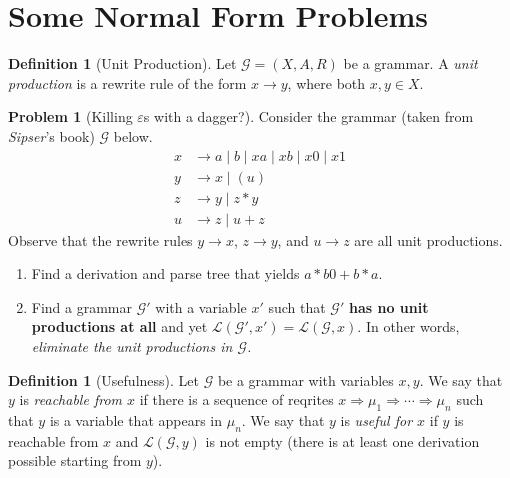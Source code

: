 \documentclass[11pt]{article}
\theoremstyle{definition} %
\newtheorem{definition}     [theorem]   {{\color{NavyBlue}Definition}}
\newtheorem{problem}                    {{\color{BurntOrange}Problem}}
\theoremstyle{remark} %
\begin{document}
\pagebreak 

\section{Some Normal Form Problems}

\begin{definition}[Unit Production]
    Let \(\mathcal G = (X, A, R)\) be a grammar.
    A \emph{unit production} is a rewrite rule of the form \(x \to y\), where both \(x,y \in X\).
\end{definition}

\begin{problem}[Killing \(\varepsilon\)s with a dagger?]
    Consider the grammar (taken from \emph{Sipser}'s book) \(\mathcal G\) below.
    \[\begin{aligned}
        x &\to a \mid b \mid xa \mid xb \mid x0 \mid x1 \\
        y &\to x \mid (u) \\
        z &\to y \mid z * y \\
        u &\to z \mid u + z 
    \end{aligned}\]
    Observe that the rewrite rules \(y \to x\), \(z \to y\), and \(u \to z\) are all unit productions.
    \begin{enumerate}
        \item Find a derivation and parse tree that yields \(a*b0+b*a\).
        \item Find a grammar \(\mathcal G'\) with a variable \(x'\) such that \(\mathcal G'\) \textbf{has no unit productions at all} and yet \(\mathcal L(\mathcal G', x') = \mathcal L(\mathcal G, x)\). In other words, \emph{eliminate the unit productions in \(\mathcal G\).}
    \end{enumerate}
\end{problem}

\pagebreak

\begin{definition}[Usefulness]
    Let \(\mathcal G\) be a grammar with variables \(x,y\).
    We say that \(y\) is \emph{reachable from \(x\)} if there is a sequence of reqrites \(x \Rightarrow \mu_1 \Rightarrow \cdots \Rightarrow \mu_n\) such that \(y\) is a variable that appears in \(\mu_n\).
    We say that \(y\) is \emph{useful for \(x\)} if \(y\) is reachable from \(x\) and \(\mathcal L(\mathcal G, y)\) is not empty (there is at least one derivation possible starting from \(y\)).
\end{definition}
\end{document}
